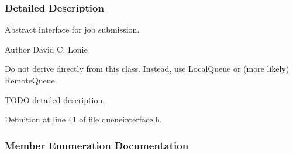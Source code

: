 \subsubsection{Detailed Description}
Abstract interface for job submission. 

\begin{DoxyAuthor}{Author}
David C. Lonie
\end{DoxyAuthor}
Do not derive directly from this class. Instead, use Local\+Queue or (more likely) Remote\+Queue.

T\+O\+D\+O detailed description. 

Definition at line 41 of file queueinterface.\+h.



\subsubsection{Member Enumeration Documentation}
\hypertarget{classGlobalSearch_1_1QueueInterface_a08dcf06d1b99f6333472470490ca9a6d}{}
